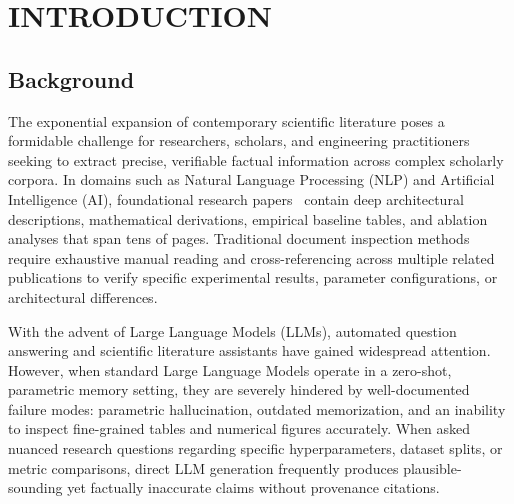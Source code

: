 \documentclass[12pt,a4paper,oneside]{report}
\begin{document}
\tableofcontents
\newpage

\listoffigures
\newpage

\listoftables
\newpage

\setcounter{page}{1}


\chapter{INTRODUCTION}

\section{Background}
The exponential expansion of contemporary scientific literature poses a formidable challenge for researchers, scholars, and engineering practitioners seeking to extract precise, verifiable factual information across complex scholarly corpora. In domains such as Natural Language Processing (NLP) and Artificial Intelligence (AI), foundational research papers~\cite{vaswani2017attention, devlin2018bert} contain deep architectural descriptions, mathematical derivations, empirical baseline tables, and ablation analyses that span tens of pages. Traditional document inspection methods require exhaustive manual reading and cross-referencing across multiple related publications to verify specific experimental results, parameter configurations, or architectural differences.

With the advent of Large Language Models (LLMs), automated question answering and scientific literature assistants have gained widespread attention. However, when standard Large Language Models operate in a zero-shot, parametric memory setting, they are severely hindered by well-documented failure modes: parametric hallucination, outdated memorization, and an inability to inspect fine-grained tables and numerical figures accurately. When asked nuanced research questions regarding specific hyperparameters, dataset splits, or metric comparisons, direct LLM generation frequently produces plausible-sounding yet factually inaccurate claims without provenance citations.
\end{document}

